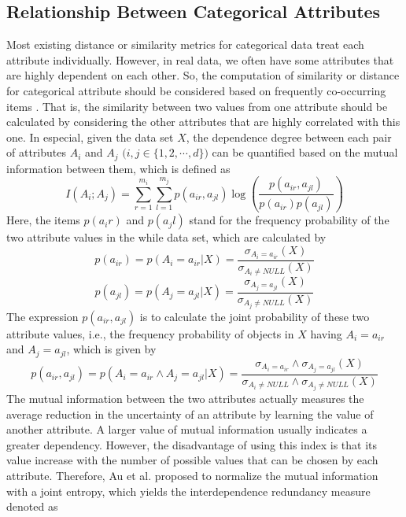 \documentclass[review]{elsarticle}
\begin{document}
\subsection{Relationship Between Categorical Attributes}
Most existing distance or similarity metrics for categorical data treat each attribute individually. However, in real data, we often have some attributes that are highly dependent on each other. So, the computation of similarity or distance for categorical attribute should be considered based on frequently co-occurring items \cite{VGanti1999CACTUS}. That is, the similarity between two values from one attribute should be calculated by considering the other attributes that are highly correlated with this one. In especial, given the data set $X$, the dependence degree between each pair of attributes $A_i$  and $A_j$ $\mathbf (i,j \in \{1,2,\cdots,d\})$ can be quantified based on the mutual information \cite{MacKay2003InformationTheory} between them, which is defined as
\begin{equation}
I(A_i;A_j) = \sum_{r=1}^{m_i}\sum_{l=1}^{m_j}p(a_{ir},a_{jl})\log(\frac{p(a_{ir},a_{jl})}{p(a_{ir})p(a_{jl})})
\label{equ7}
\end{equation}
Here, the items $p(a_ir)$ and $p(a_jl)$ stand for the frequency probability of the two attribute values in the while data set, which are calculated by
\begin{equation}
p(a_{ir}) = p(A_i = a_{ir}|X) = \frac{\sigma_{A_i = a_{ir}}(X)}{\sigma_{A_i \neq NULL}(X)}
\label{equ8}
\end{equation}
\begin{equation}
p(a_{jl}) = p(A_j = a_{jl}|X) = \frac{\sigma_{A_j = a_{jl}}(X)}{\sigma_{A_j \neq NULL}(X)}
\label{equ9}
\end{equation}
The expression $p(a_{ir},a_{jl})$ is to calculate the joint probability of these two attribute values, i.e., the frequency probability of objects in $X$ having $A_i = a_{ir}$ and $A_j = a_{jl}$, which is given by
\begin{equation}
p(a_{ir},a_{jl}) = p(A_i = a_{ir} \wedge A_j = a_{jl}|X) = \frac{\sigma_{A_i = a_{ir}} \wedge \sigma_{A_j = a_{jl}}(X)}{\sigma_{A_i \neq NULL} \wedge \sigma_{A_j \neq NULL}(X)}
\label{equ10}
\end{equation}
The mutual information between the two attributes actually measures the average reduction in the uncertainty of an attribute by learning the value of another attribute. A larger value of mutual information usually indicates a greater dependency. However, the disadvantage of using this index is that its value increase with the number of possible values that can be chosen by each attribute. Therefore, Au et al. \cite{WaiHoAu2005Grouping} proposed to normalize the mutual information with a joint entropy, which yields the interdependence redundancy measure denoted as
\end{document}
